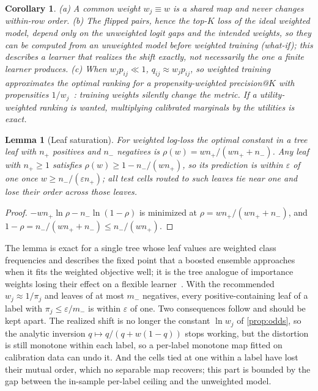 \documentclass[sigconf,nonacm]{acmart}
\newtheorem{lemma}{Lemma}
\newtheorem{corollary}{Corollary}
\begin{document}
\begin{corollary}
\label{cor:odds}
(a) A common weight $w_j\equiv w$ is a shared map and never changes within-row order. (b) The flipped pairs, hence the top-$K$ loss of the \emph{ideal} weighted model, depend only on the unweighted logit gaps and the intended weights, so they can be computed from an unweighted model before weighted training (\emph{what-if}); this describes a learner that realizes the shift exactly, not necessarily the one a finite learner produces. (c) When $w_jp_{ij}\ll1$, $q_{ij}\approx w_jp_{ij}$, so weighted training approximates the optimal ranking for a propensity-weighted precision@$K$ with propensities $1/w_j$~\cite{Jain2016XMLLoss}: training weights silently change the metric. If a utility-weighted ranking is wanted, multiplying calibrated marginals by the utilities is exact.
\end{corollary}

\begin{lemma}[Leaf saturation]
\label{lem:leaf}
For weighted log-loss the optimal constant in a tree leaf with $n_+$ positives and $n_-$ negatives is $\rho(w)=wn_+/(wn_++n_-)$. Any leaf with $n_+\ge1$ satisfies $\rho(w)\ge1-n_-/(wn_+)$, so its prediction is within $\varepsilon$ of one once $w\ge n_-/(\varepsilon n_+)$; all test cells routed to such leaves tie near one and lose their order across those leaves.
\end{lemma}
\begin{proof}
$-wn_+\ln\rho-n_-\ln(1-\rho)$ is minimized at $\rho=wn_+/(wn_++n_-)$, and $1-\rho=n_-/(wn_++n_-)\le n_-/(wn_+)$.
\end{proof}

The lemma is exact for a single tree whose leaf values are weighted class frequencies and describes the fixed point that a boosted ensemble approaches when it fits the weighted objective well; it is the tree analogue of importance weights losing their effect on a flexible learner~\cite{Byrd2019}. With the recommended $w_j\approx1/\pi_j$ and leaves of at most $m_-$ negatives, every positive-containing leaf of a label with $\pi_j\le\varepsilon/m_-$ is within $\varepsilon$ of one. Two consequences follow and should be kept apart. The realized shift is no longer the constant $\ln w_j$ of \cref{prop:odds}, so the analytic inversion $q\mapsto q/(q+w(1-q))$ stops working, but the distortion is still monotone within each label, so a per-label monotone map fitted on calibration data can undo it. And the cells tied at one within a label have lost their mutual order, which no separable map recovers; this part is bounded by the gap between the in-sample per-label ceiling and the unweighted model.
\end{document}
